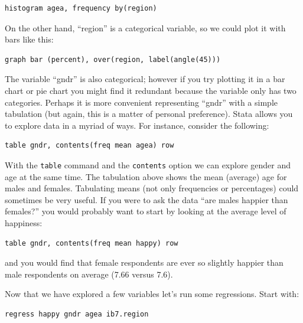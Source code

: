 \begin{lstlisting}
histogram agea, frequency by(region)
\end{lstlisting}

On the other hand, ``region'' is a categorical variable, so we could plot it with bars like this:

\begin{lstlisting}
graph bar (percent), over(region, label(angle(45)))
\end{lstlisting}

The variable ``gndr'' is also categorical; however if you try plotting it in a bar chart or pie chart you might find it redundant because the variable only has two categories. Perhaps it is more convenient representing ``gndr'' with a simple tabulation (but again, this is a matter of personal preference). Stata allows you to explore data in a myriad of ways. For instance, consider the following:

\begin{lstlisting}
table gndr, contents(freq mean agea) row
\end{lstlisting}

With the \texttt{table} command and the \texttt{contents} option we can explore gender and age at the same time. The tabulation above shows the mean (average) age for males and females. Tabulating means (not only frequencies or percentages) could sometimes be very useful. If you were to ask the data ``are males happier than females?'' you would probably want to start by looking at the average level of happiness:

\begin{lstlisting}
table gndr, contents(freq mean happy) row
\end{lstlisting}

and you would find that female respondents are ever so slightly happier than male respondents on average (7.66 versus 7.6).

Now that we have explored a few variables let's run some regressions. Start with:

\begin{lstlisting}
regress happy gndr agea ib7.region
\end{lstlisting}

